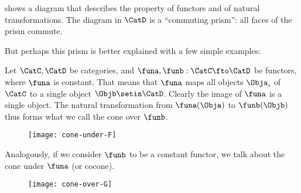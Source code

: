 




 shows a diagram that describes the property of functors and of natural transformations.
The diagram in $\CatD$ is a ``commuting prism'': all faces of the prism commute.

\begin{figure*}[h]
    \centering
    \begin{ctdefinitionshade}
        \small
    \end{ctdefinitionshade}
    \caption{}
    \label{fig:nat_trans_graphically}
\end{figure*}

But perhaps this prism is better explained with a few simple examples:

\begin{example}
Let $\CatC, \CatD$ be categories, and $\funa, \funb:\CatC\fto\CatD$ be functors, where $\funa$ is constant. That means that $\funa$ maps 
all objects $\Obja_i$ of $\CatC$ to a single object $\Objb \setin \CatD$. Clearly the image of $\funa$ is a single object. The natural transformation from $\funa(\Obja)$ to $\funb(\Objb)$ thus forms what we call the cone over $\funb$.

\begin{figure*}[h]
    \texttt{[image: cone-under-F]}
\end{figure*}
Analogously, if we consider $\funb$ to be a constant functor, we talk about the cone under $\funa$ (or cocone).
\begin{figure*}[h]
    \texttt{[image: cone-over-G]}
\end{figure*}
\end{example}


